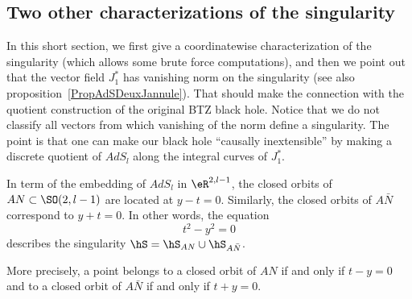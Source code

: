 \subsection{Two other characterizations of the singularity}		\label{SubSecTwoCharSing}

In this short section, we first give a coordinatewise characterization of the singularity (which allows some brute force computations), and then we point out that the vector field $J_1^*$ has vanishing norm on the singularity (see also proposition~\ref{PropAdSDeuxJannule}). That should make the connection with the quotient construction of the original BTZ black hole.  Notice that we do not classify all vectors from which vanishing of the norm define a singularity. The point is that one can make our black hole ``causally inextensible'' by making a discrete quotient of $AdS_l$ along the integral curves of $J^*_1$.

\begin{proposition}		\label{Proptcarrycarr}
	In term of the embedding of $AdS_l$ in $\eR^{2,l-1}$, the closed orbits of $AN \subset \SO(2,l-1)$ are located at $y-t = 0$.  Similarly, the closed orbits of $A \bar{N}$ correspond to $y+t=0$. In other words, the equation
	\begin{equation} \label{tcarrycarr}
		t^2-y^2=0
	\end{equation}
	describes the singularity $\hS=\hS_{AN}\cup\hS_{A\bar{N}}$.

	More precisely, a point belongs to a closed orbit of $AN$ if and only if $t-y=0$ and to a closed orbit of $A\bar N$ if and only if $t+y=0$.
\end{proposition}

